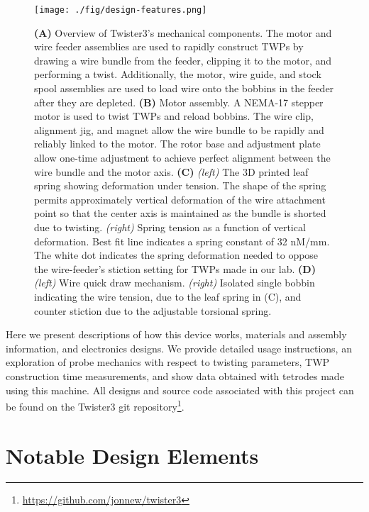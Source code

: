 \documentclass[11pt,a4paper]{article}
\begin{document}
\begin{figure}
\centering \texttt{[image: ./fig/design-features.png]}
\caption{\textbf{(A)} Overview of Twister3's mechanical components. The
    motor and wire feeder assemblies are used to rapidly construct TWPs by
    drawing a wire bundle from the feeder, clipping it to the motor, and
    performing a twist. Additionally, the motor, wire guide, and stock spool
    assemblies are used to load wire onto the bobbins in the feeder after they
    are depleted.
    \textbf{(B)} Motor assembly. A NEMA-17 stepper motor is used to twist TWPs
    and reload bobbins. The wire clip, alignment jig, and magnet allow the wire
    bundle to be rapidly and reliably linked to the motor. The rotor base and
    adjustment plate allow one-time adjustment to achieve perfect alignment
    between the wire bundle and the motor axis.
    \textbf{(C)} \textit{(left)} The 3D printed leaf spring showing deformation
    under tension. The shape of the spring permits approximately vertical
    deformation of the wire attachment point so that the center axis is
    maintained as the bundle is shorted due to twisting. \textit{(right)}
    Spring tension as a function of vertical deformation. Best fit line
    indicates a spring constant of 32 nM/mm. The white dot indicates the spring deformation
    needed to oppose the wire-feeder's stiction setting for TWPs made in our lab.
    \textbf{(D)} \textit{(left)} Wire quick draw mechanism. \textit{(right)} Isolated
    single bobbin indicating the wire tension, due to the leaf spring in (C),
    and counter stiction due to the adjustable torsional spring.}
\label{f:design_features}
\end{figure}

Here we present descriptions of how this device works, materials and assembly
information, and electronics designs. We provide detailed usage
instructions, an exploration of probe mechanics with respect to twisting
parameters, TWP construction time measurements, and show data obtained with
tetrodes made using this machine. All designs and source code associated with
this project can be found on the Twister3 git
repository\footnote{\url{https://github.com/jonnew/twister3}}.

\section{Notable Design Elements}
\end{document}
